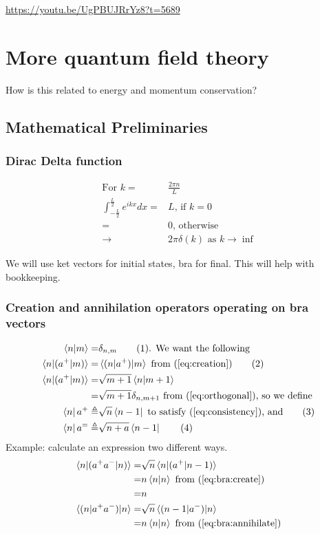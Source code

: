 \documentclass[]{article}
\newcommand\numberthis{\addtocounter{equation}{1}\tag{\theequation}}
\begin{document}
\url{https://youtu.be/UgPBUJRrYz8?t=5689}


\section{More quantum field theory}

How is this related to energy and momentum conservation?

\subsection{Mathematical Preliminaries}

\subsubsection{Dirac Delta function}

\begin{align*}
\text{For } k =& \frac{2 \pi n}{L}\\
\int_{-\frac{L}{2}}^{\frac{L}{2}} e^{ikx} dx =& L \text{, if $k =0$}\\
=& 0 \text{, otherwise}\\
\rightarrow& 2 \pi \delta(k) \text{ as $k \rightarrow \inf$}
\end{align*}

We will use ket vectors for initial states, bra for final. This will help with bookkeeping.

\subsubsection{Creation and annihilation operators operating on bra vectors}

\begin{align*}
\braket{n|m} =& \delta_{n,m}\numberthis \label{eq:orthogonal} \text{. We want the following}\\
\braket{n|(a^+|m)} =& \braket{(n|a^+)|m} \text{ from (\ref{eq:creation})} \numberthis \label{eq:consistency}\\
\braket{n|(a^+|m)} =& \sqrt{m+1} \braket{n|m+1}\\
=& \sqrt{m+1} \delta_{n,m+1} \text{ from (\ref{eq:orthogonal})} \text{, so we define}\\
\bra{n} a^+ \triangleq & \sqrt{n} \bra{n-1} \text{ to satisfy (\ref{eq:consistency}), and} \numberthis \label{eq:bra:create}\\
\bra{n} a^= \triangleq & \sqrt{n+a} \bra{n-1} \numberthis \label{eq:bra:annihilate}
\end{align*}
Example: calculate an expression two different ways.
\begin{align*}
\braket{n|(a^+a^-|n)} =& \sqrt{n}\braket{n|(a^+|n-1)}\\
=& n \braket{n|n} \text{ from (\ref{eq:bra:create})}\\
=& n\\
\braket{(n|a^+a^-)|n} =& \sqrt{n} \braket{(n-1|a^-)|n}\\
=& n \braket{n|n} \text{ from (\ref{eq:bra:annihilate})}
\end{align*}
\end{document}
